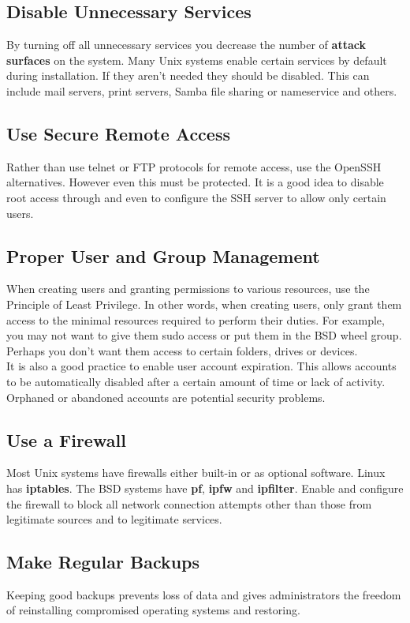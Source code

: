 \subsection{Disable Unnecessary Services}

By turning off all unnecessary services you decrease the number of \textbf{attack surfaces} on the system.  Many Unix systems enable certain services by default during installation.  If they aren't needed they should be disabled.  This can include mail servers, print servers, Samba file sharing or nameservice and others.

\subsection{Use Secure Remote Access}

Rather than use telnet or FTP protocols for remote access, use the OpenSSH alternatives.  However even this must be protected.  It is a good idea to disable root access through and even to configure the SSH server to allow only certain users.

\subsection{Proper User and Group Management}

When creating users and granting permissions to various resources, use the Principle of Least Privilege.  In other words, when creating users, only grant them access to the minimal resources required to perform their duties.  For example, you may not want to give them sudo access or put them in the BSD wheel group.  Perhaps you don't want them access to certain folders, drives or devices.\\

It is also a good practice to enable user account expiration.  This allows accounts to be automatically disabled after a certain amount of time or lack of activity.  Orphaned or abandoned accounts are potential security problems.

\subsection{Use a Firewall}

Most Unix systems have firewalls either built-in or as optional software.  Linux has \textbf{iptables}.  The BSD systems have \textbf{pf}, \textbf{ipfw} and \textbf{ipfilter}.  Enable and configure the firewall to block all network connection attempts other than those from legitimate sources and to legitimate services.

\subsection{Make Regular Backups}

Keeping good backups prevents loss of data and gives administrators the freedom of reinstalling compromised operating systems and restoring.


